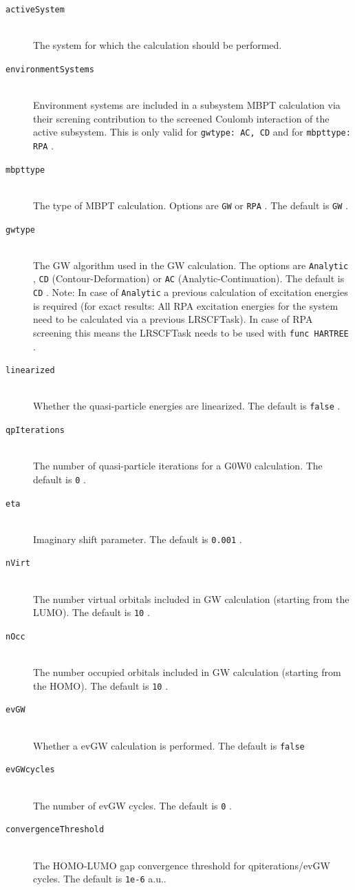 \documentclass[bibliography=totocnumbered,a4paper,10pt,oneside]{scrbook}
\newcommand{\ttt}[1]{%
  \begingroup\setlength{\fboxsep}{1pt}%
  \colorbox{serenity-green!30}{\texttt{\hspace*{2pt}\vphantom{(g}#1\hspace*{2pt}}}%
  \endgroup
}
\begin{document}
\begin{description}
  \item [\texttt{activeSystem}]\hfill \\
  The system for which the calculation should be performed.
  \item [\texttt{environmentSystems}]\hfill \\
  Environment systems are included in a subsystem MBPT calculation via their screning contribution to the screened Coulomb interaction of the active subsystem. This is only valid for \ttt{gwtype: AC, CD} and for \ttt{mbpttype: RPA}.  
  \item [\texttt{mbpttype}]\hfill \\
  The type of MBPT calculation. Options are \ttt{GW} or \ttt{RPA}. The default is \ttt{GW}.
  \item [\texttt{gwtype}]\hfill \\
  The GW algorithm used in the GW calculation. The options are \ttt{Analytic}, \ttt{CD} (Contour-Deformation) or \ttt{AC} (Analytic-Continuation). The default is \ttt{CD}. Note: In case of \ttt{Analytic} a previous calculation of excitation energies is required (for exact results: All RPA excitation energies for the system need to be calculated via a previous LRSCFTask). In case of RPA screening this means the LRSCFTask needs to be used with \ttt{func HARTREE}.
  \item [\texttt{linearized}]\hfill \\
  Whether the quasi-particle energies are linearized. The default is \ttt{false}.
  \item [\texttt{qpIterations}]\hfill \\
  The number of quasi-particle iterations for a G0W0 calculation. The default is \ttt{0}.
  \item [\texttt{eta}]\hfill \\
  Imaginary shift parameter. The default is \ttt{0.001}.
  \item [\texttt{nVirt}]\hfill \\
  The number virtual orbitals included in GW calculation (starting from the LUMO). The default is \ttt{10}.
  \item [\texttt{nOcc}]\hfill \\
  The number occupied orbitals included in GW calculation (starting from the HOMO). The default is \ttt{10}.
  \item [\texttt{evGW}]\hfill \\
  Whether a evGW calculation is performed. The default is \ttt{false}
  \item [\texttt{evGWcycles}]\hfill \\
  The number of evGW cycles. The default is \ttt{0}.
  \item [\texttt{convergenceThreshold}]\hfill \\
  The HOMO-LUMO gap convergence threshold for qpiterations/evGW cycles. The default is \ttt{1e-6} a.u..
\end{description}
\end{document}
